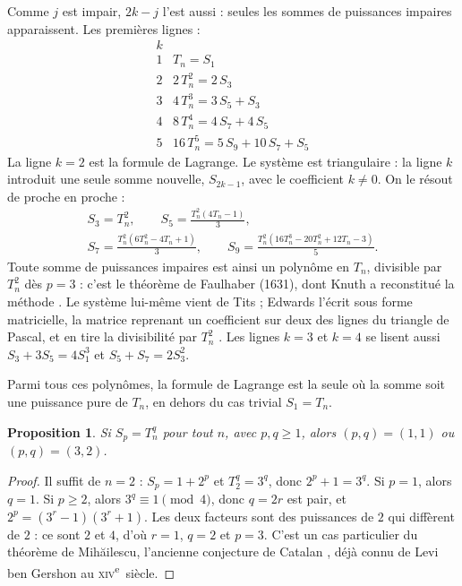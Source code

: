 \documentclass[11pt,a4paper]{article}
\newtheorem{proposition}{Proposition}
\theoremstyle{remark}
\begin{document}
Comme $j$ est impair, $2k - j$ l'est aussi : seules les sommes de puissances
impaires apparaissent. Les premières lignes :
\[
\begin{array}{c|l}
k & \\ \hline
1 & T_n = S_1 \\
2 & 2\,T_n^2 = 2\,S_3 \\
3 & 4\,T_n^3 = 3\,S_5 + S_3 \\
4 & 8\,T_n^4 = 4\,S_7 + 4\,S_5 \\
5 & 16\,T_n^5 = 5\,S_9 + 10\,S_7 + S_5
\end{array}
\]
La ligne $k = 2$ est la formule de Lagrange. Le système est triangulaire :
la ligne $k$ introduit une seule somme nouvelle, $S_{2k-1}$, avec le
coefficient $k \neq 0$. On le résout de proche en proche :
\begin{gather*}
S_3 = T_n^2, \qquad
S_5 = \frac{T_n^2(4T_n - 1)}{3}, \\
S_7 = \frac{T_n^2(6T_n^2 - 4T_n + 1)}{3}, \qquad
S_9 = \frac{T_n^2(16T_n^3 - 20T_n^2 + 12T_n - 3)}{5}.
\end{gather*}
Toute somme de puissances impaires est ainsi un polynôme en $T_n$, divisible
par $T_n^2$ dès $p = 3$ : c'est le théorème de Faulhaber (1631), dont Knuth
a reconstitué la méthode \cite{knuth}. Le système lui-même vient de Tits ;
Edwards l'écrit sous forme matricielle, la matrice reprenant un coefficient
sur deux des lignes du triangle de Pascal, et en tire la divisibilité par
$T_n^2$ \cite{tits,edwards}. Les lignes $k = 3$ et $k = 4$ se
lisent aussi $S_3 + 3S_5 = 4S_1^3$ et $S_5 + S_7 = 2S_3^2$.

Parmi tous ces polynômes, la formule de Lagrange est la seule où la somme
soit une puissance pure de $T_n$, en dehors du cas trivial $S_1 = T_n$.

\begin{proposition}\label{prop:lagrange}
Si $S_p = T_n^q$ pour tout $n$, avec $p, q \geq 1$, alors $(p, q) = (1, 1)$
ou $(p, q) = (3, 2)$.
\end{proposition}

\begin{proof}
Il suffit de $n = 2$ : $S_p = 1 + 2^p$ et $T_2^q = 3^q$, donc
$2^p + 1 = 3^q$. Si $p = 1$, alors $q = 1$. Si $p \geq 2$, alors
$3^q \equiv 1 \pmod 4$, donc $q = 2r$ est pair, et
$2^p = (3^r - 1)(3^r + 1)$. Les deux facteurs sont des puissances de $2$ qui
diffèrent de $2$ : ce sont $2$ et $4$, d'où $r = 1$, $q = 2$ et $p = 3$.
C'est un cas particulier du théorème de Mihăilescu, l'ancienne conjecture
de Catalan \cite{mihailescu}, déjà connu de Levi ben Gershon au
\textsc{xiv}\textsuperscript{e}~siècle.
\end{proof}
\end{document}
